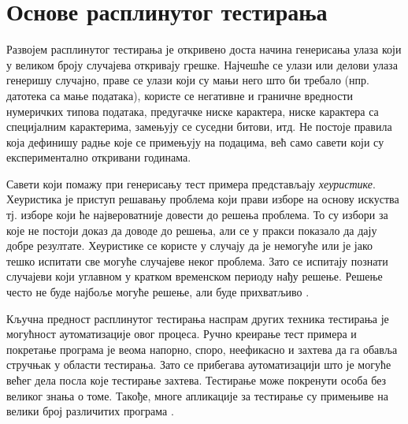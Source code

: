 \documentclass[12pt,oneside]{memoir}
\begin{document}
\section{Основе расплинутог тестирања}

Развојем расплинутог тестирања је откривено доста начина генерисања улаза који у великом броју случајева откривају грешке. Најчешће се улази или делови улаза генеришу случајно, праве се улази који су мањи него што би требало (нпр. датотека са мање података), користе се негативне и граничне вредности нумеричких типова података, предугачке ниске карактера, ниске карактера са специјалним карактерима, замењују се суседни битови, итд. Не постоје правила која дефинишу радње које се примењују на подацима, већ само савети који су експериментално откривани годинама.  

Савети који помажу при генерисању тест примера представљају \textit{хеуристике}. Хеуристика је приступ решавању проблема који прави изборе на основу искуства тј. изборе који ће највероватније довести до решења проблема. То су избори за које не постоји доказ да доводе до решења, али се у пракси показало да дају добре резултате. Хеуристике се користе у случају да је немогуће или је јако тешко испитати све могуће случајеве неког проблема. Зато се испитају познати случајеви који углавном у кратком временском периоду нађу решење. Решење често не буде најбоље могуће решење, али буде прихватљиво \cite{heuristics}.

Кључна предност расплинутог тестирања наспрам других техника тестирања је могућност аутоматизације овог процеса. Ручно креирање тест примера и покретање програма је веома напорно, споро, неефикасно и захтева да га обавља стручњак у области тестирања. Зато се прибегава аутоматизацији што је могуће већег дела посла које тестирање захтева. Тестирање може покренути особа без великог знања о томе. Такође, многе апликације за тестирање су примењиве на велики број различитих програма \cite{fuzzingBrute, fuzzing}.
\end{document}
